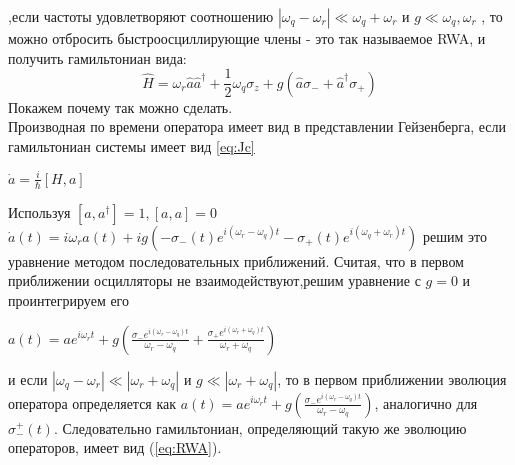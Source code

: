 \documentclass[12pt, a4paper, openany]{book}
\begin{document}
,если частоты удовлетворяют соотношению $|\omega_q-\omega_r| \ll \omega_q + \omega_r$ и $g \ll \omega_q,\omega_r$
, то можно отбросить быстроосциллирующие члены - это так называемое RWA, и получить гамильтониан вида:
\begin{equation}
\hat{H}=\omega_r\hat{a}\hat{a}^{\dagger}+\frac{1}{2}\omega_q\sigma_z+
g(\hat{a}\sigma_-+\hat{a}^{\dagger}\sigma_+)
\label{eq:RWA}
\end{equation}
Покажем почему так можно сделать.\\
Производная по времени оператора имеет вид в представлении
Гейзенберга, если гамильтониан системы имеет вид \ref{eq:Jc}
\begin{center}
$
\dot{a}=\frac{i}{\hbar}[H,a]
$
\end{center}
Используя $[a,a^{\dagger}]=1,[a,a]=0$ \\
$\dot{a}(t)=i\omega_r a(t) +ig(-\sigma_ -(t) e^{i(\omega_r-\omega_q)t} - \sigma_+(t)e^{i(\omega_q+\omega_r)t})$
решим это уравнение методом последовательных приближений. Считая, что в первом приближении осцилляторы не взаимодействуют,решим уравнение с $g=0$ и проинтегрируем его
\begin{center}
$a(t)=ae^{i\omega_rt}+g(\frac{\sigma_-e^{i(\omega_r-\omega_q)t}}{\omega_r-\omega_q}+\frac{\sigma_+e^{i(\omega_r+\omega_q)t}}{\omega_r+\omega_q})$
\end{center}
и если $|\omega_q-\omega_r| \ll |\omega_r+\omega_q|$ и
$g \ll |\omega_r+\omega_q|$, то в первом приближении
эволюция оператора  определяется как 
$a(t)=ae^{i\omega_rt}+g(\frac{\sigma_-e^{i(\omega_r-\omega_q)t}}{\omega_r-\omega_q})$, аналогично для $\sigma_-^+(t)$.
Следовательно гамильтониан, определяющий такую же эволюцию операторов, имеет вид (\ref{eq:RWA}).
\end{document}
